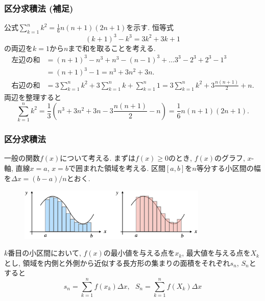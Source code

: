 

\begin{frame}
\frametitle{区分求積法 (補足)}

公式$\displaystyle \sum_{k=1}^n k^2=  \frac{1}{6}n(n+1)(2n+1)$を示す. 恒等式
$$
(k+1)^3-k^3=3k^2+3k+1
$$
の両辺を$k=1$から$n$まで和を取ることを考える. 
\begin{align*}
\text{左辺の和} & = (n+1)^3-n^3+n^3-(n-1)^3+\dots3^3-2^3+2^3-1^3\\
& = (n+1)^3-1=n^3+3n^2+3n. \\
\text{右辺の和} &= 3\sum_{k=1}^n k^2+3\sum_{k=1}^n k+\sum_{k=1}^n 1=  3\sum_{k=1}^n k^2+3\frac{n(n+1)}{2}+n. 
\end{align*}
両辺を整理すると
$$
\sum_{k=1}^n k^2 = \frac{1}{3}(n^3+3n^2+3n-3\frac{n(n+1)}{2}-n)
=  \frac{1}{6}n(n+1)(2n+1). 
$$

\end{frame}




\begin{frame}
\frametitle{区分求積法}

一般の関数$f(x)$について考える. 
まずは$f(x) \ge 0$のとき, $f(x)$のグラフ, $x$-軸, 直線$x=a$, $x=b$で囲まれた領域を考える. 
区間$[a,b]$を$n$等分する小区間の幅を$\Delta x = (b-a)/n$とおく. 

\vspace{-2mm}

\begin{figure}[htbp]
 \begin{center} 
  \includegraphics[width=90mm]{calculus12/RiemannSum3.png}
 \end{center}
\end{figure}

\vspace{-2mm}


$k$番目の小区間において, $f(x)$の最小値を与える点を$x_k$, 最大値を与える点を$X_k$とし, 
領域を内側と外側から近似する長方形の集まりの面積をそれぞれ$s_n$, $S_n$とすると
$$
s_n=\sum_{k=1}^nf(x_k)\Delta x, \ \ \ S_n=\sum_{k=1}^nf(X_k)\Delta x
$$




\end{frame}


